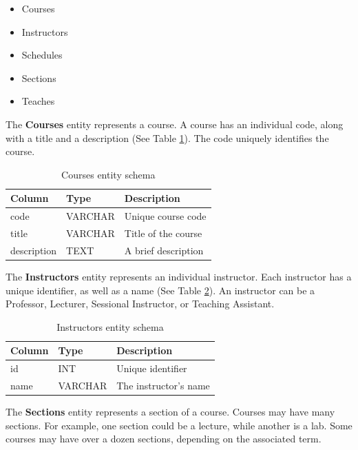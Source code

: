 \documentclass[12pt,letterpaper,oneside,notitlepage]{report}
\theoremstyle{definition}
\begin{document}
			\begin{itemize}
				\item Courses
				\item Instructors
				\item Schedules
				\item Sections
				\item Teaches
			\end{itemize}
			
			The \textbf{Courses} entity represents a course.  A course has an individual code, along with a title and a description (See Table  \ref{tbl:courses-entity-schema}).  The code uniquely identifies the course.
			
			\begin{table}[!htp]
				\centering
				\begin{tabular}{lll}
					\toprule
					Column & Type & Description \\
					\midrule
					code & VARCHAR & Unique course code \\
					title & VARCHAR & Title of the course \\
					description & TEXT & A brief description \\
					\bottomrule
				\end{tabular}
				\caption{Courses entity schema}
				\label{tbl:courses-entity-schema}
			\end{table}
			
			The \textbf{Instructors} entity represents an individual instructor.  Each instructor has a unique identifier, as well as a name (See Table \ref{tbl:instructors-entity-schema}).  An instructor can be a Professor, Lecturer, Sessional Instructor, or Teaching Assistant.
			
			\begin{table}[!htp]
				\centering
				\begin{tabular}{lll}
					\toprule
					Column & Type & Description \\
					\midrule
					id & INT & Unique identifier \\
					name & VARCHAR & The instructor's name \\
					\bottomrule
				\end{tabular}
				\caption{Instructors entity schema}
				\label{tbl:instructors-entity-schema}
			\end{table}
			
			The \textbf{Sections} entity represents a section of a course.  Courses may have many sections.  For example, one section could be a lecture, while another is a lab.  Some courses may have over a dozen sections, depending on the associated term.
			
\end{document}

